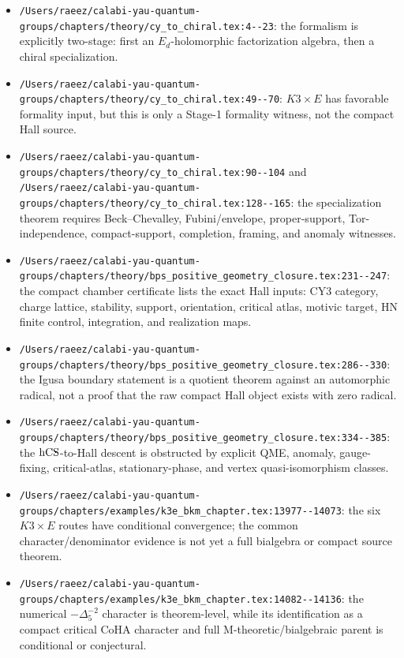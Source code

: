 \begin{itemize}
\item \verb|/Users/raeez/calabi-yau-quantum-groups/chapters/theory/cy_to_chiral.tex:4--23|:
the formalism is explicitly two-stage: first an \(E_d\)-holomorphic
factorization algebra, then a chiral specialization.

\item \verb|/Users/raeez/calabi-yau-quantum-groups/chapters/theory/cy_to_chiral.tex:49--70|:
\(K3\times E\) has favorable formality input, but this is only a
Stage-1 formality witness, not the compact Hall source.

\item \verb|/Users/raeez/calabi-yau-quantum-groups/chapters/theory/cy_to_chiral.tex:90--104| and
\verb|/Users/raeez/calabi-yau-quantum-groups/chapters/theory/cy_to_chiral.tex:128--165|:
the specialization theorem requires Beck--Chevalley, Fubini/envelope,
proper-support, Tor-independence, compact-support, completion, framing,
and anomaly witnesses.

\item \verb|/Users/raeez/calabi-yau-quantum-groups/chapters/theory/bps_positive_geometry_closure.tex:231--247|:
the compact chamber certificate lists the exact Hall inputs: CY3
category, charge lattice, stability, support, orientation, critical
atlas, motivic target, HN finite control, integration, and realization
maps.

\item \verb|/Users/raeez/calabi-yau-quantum-groups/chapters/theory/bps_positive_geometry_closure.tex:286--330|:
the Igusa boundary statement is a quotient theorem against an automorphic
radical, not a proof that the raw compact Hall object exists with zero
radical.

\item \verb|/Users/raeez/calabi-yau-quantum-groups/chapters/theory/bps_positive_geometry_closure.tex:334--385|:
the \(\mathrm{hCS}\)-to-Hall descent is obstructed by explicit QME, anomaly,
gauge-fixing, critical-atlas, stationary-phase, and vertex
quasi-isomorphism classes.

\item \verb|/Users/raeez/calabi-yau-quantum-groups/chapters/examples/k3e_bkm_chapter.tex:13977--14073|:
the six \(K3\times E\) routes have conditional convergence; the common
character/denominator evidence is not yet a full bialgebra or compact
source theorem.

\item \verb|/Users/raeez/calabi-yau-quantum-groups/chapters/examples/k3e_bkm_chapter.tex:14082--14136|:
the numerical \(-\Delta_5^{-2}\) character is theorem-level, while its
identification as a compact critical CoHA character and full
M-theoretic/bialgebraic parent is conditional or conjectural.


\end{itemize}
